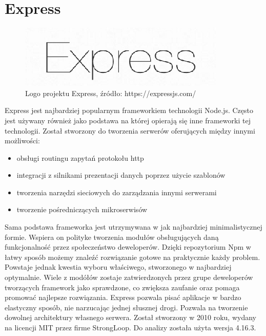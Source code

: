 \documentclass[12pt]{report}
\begin{document}
  \section{Express}
    \begin{figure}[!hb]
      \centering
      \includegraphics[width=\textwidth,height=\textheight,keepaspectratio]{logo_express.png} 
      \caption{Logo projektu Express, źródło: https://expressjs.com/}
    \end{figure}
    Express jest najbardziej popularnym frameworkiem technologii Node.js.
    Często jest używany również jako podstawa na której opierają się inne frameworki tej technologii.
    Został stworzony do tworzenia serwerów oferujących między innymi możliwości:
    \begin{itemize}
      \item obsługi routingu zapytań protokołu http
      \item integracji z silnikami prezentacji danych poprzez użycie szablonów
      \item tworzenia narzędzi sieciowych do zarządzania innymi serwerami
      \item tworzenie pośredniczących mikroserwisów
    \end{itemize} 
    Sama podstawa frameworka jest utrzymywana w jak najbardziej minimalistycznej formie.
    Wspiera on polityke tworzenia modułów obsługujących daną funkcjonalność przez społeczeństwo deweloperów.
    Dzięki repozytorium Npm w łatwy sposób możemy znaleźć rozwiązanie gotowe na praktycznie każdy problem.
    Powstaje jednak kwestia wyboru właściwego, stworzonego w najbardziej optymalnie.
    Wiele z modółów zostaje zatwierdzonych przez grupe deweloperów tworzących framework jako sprawdzone, co zwiększa zaufanie oraz pomaga promować najlepsze rozwiązania.
    Express pozwala pisać aplikacje w bardzo elastyczny sposób, nie narzucając jednej słusznej drogi.
    Pozwala na tworzenie dowolnej architektury własnego serwera.
    Został stworzony w 2010 roku, wydany na licencji MIT przez firme StrongLoop.
    Do analizy została użyta wersja 4.16.3.
\end{document}
